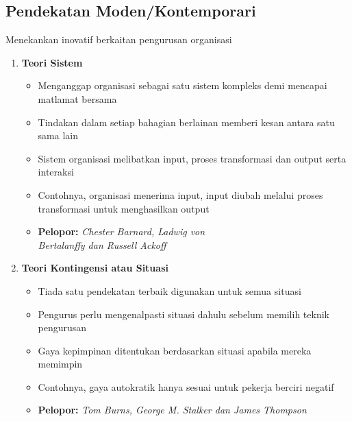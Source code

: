 \documentclass{book}
\begin{document}
\begin{multicols*}{2}
    \subsection*{Pendekatan Moden/Kontemporari}
    Menekankan inovatif berkaitan pengurusan organisasi
    \begin{enumerate}
      \item \textbf{Teori Sistem}
        \begin{itemize}[leftmargin=*]
          \item Menganggap organisasi sebagai satu sistem kompleks demi mencapai matlamat bersama
          \item Tindakan dalam setiap bahagian berlainan memberi kesan antara satu sama lain 
          \item Sistem organisasi melibatkan input, proses transformasi dan output serta interaksi
          \item Contohnya, organisasi menerima input, input diubah melalui proses transformasi untuk 
            menghasilkan output
          \item \textbf{Pelopor:} \emph{Chester Barnard, Ladwig von\\ Bertalanffy dan Russell Ackoff}
        \end{itemize}
      \item \textbf{Teori Kontingensi atau Situasi}
        \begin{itemize}
          \item Tiada satu pendekatan terbaik digunakan untuk semua situasi
          \item Pengurus perlu mengenalpasti situasi dahulu sebelum memilih teknik pengurusan
          \item Gaya kepimpinan ditentukan berdasarkan situasi apabila mereka memimpin
          \item Contohnya, gaya autokratik hanya sesuai untuk pekerja berciri negatif 
          \item \textbf{Pelopor:} \emph{Tom Burns, George M. Stalker dan James Thompson}
        \end{itemize}
    \end{enumerate}
  \end{multicols*}
\end{document}
